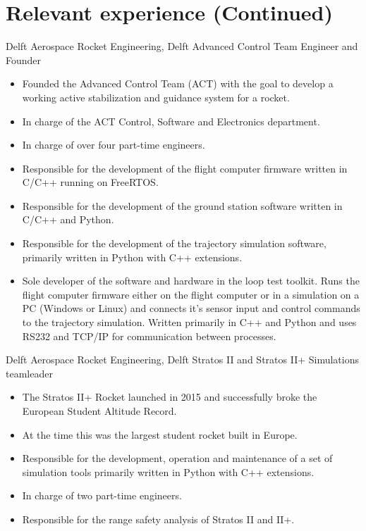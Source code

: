 \documentclass{tccv}
\begin{document}
\section{Relevant experience (Continued)}
\begin{eventlist}
     {Delft Aerospace Rocket Engineering, Delft}
     {Advanced Control Team Engineer and Founder}
\begin{itemize}
    \item {Founded the Advanced Control Team (ACT) with the goal to develop a working active stabilization and guidance system for a rocket.}
    \item {In charge of the ACT Control, Software and Electronics department.}
    \item {In charge of  over four part-time engineers.}
    \item {Responsible for the development of the flight computer firmware written in C/C++ running on FreeRTOS.}
    \item {Responsible for the development of the ground station software written in C/C++ and Python.}
    \item {Responsible for the development of the trajectory simulation software, primarily written in Python with C++ extensions.}
    \item {Sole developer of the software and hardware in the loop test toolkit. Runs the flight computer firmware either on the flight computer or in a simulation on a PC (Windows or Linux) and connects it's sensor input and control commands to the trajectory simulation. Written primarily in C++ and Python and uses RS232 and TCP/IP for communication between processes.}
\end{itemize}



     {Delft Aerospace Rocket Engineering, Delft}
     {Stratos II and Stratos II+ Simulations teamleader}
\begin{itemize}
    \item {The Stratos II+ Rocket launched in 2015 and successfully broke the European Student Altitude Record.}
    \item {At the time this was the largest student rocket built in Europe.}
    \item {Responsible for the development, operation and maintenance of a set of simulation tools primarily written in Python with C++ extensions.}
    \item{In charge of two part-time engineers.}
    \item{Responsible for the range safety analysis of Stratos II and II+.}
\end{itemize}


\end{eventlist}
\end{document}
